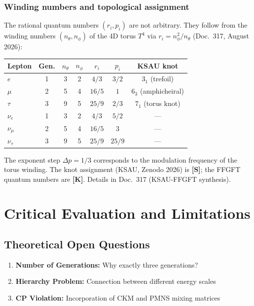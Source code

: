 	
\subsubsection{Winding numbers and topological assignment}

The rational quantum numbers $(r_i, p_i)$ are not arbitrary.
They follow from the winding numbers $(n_\theta, n_\phi)$ of
the 4D torus $T^4$ via $r_i = n_\phi^2 / n_\theta$ (Doc.~317,
August 2026):

\begin{center}
\begin{tabular}{lcccccc}
\toprule
Lepton & Gen. & $n_\theta$ & $n_\phi$ & $r_i$ & $p_i$ &
  KSAU knot \\
\midrule
$e$       & 1 & 3 & 2 & $4/3$  & $3/2$ & $3_1$ (trefoil) \\
$\mu$     & 2 & 5 & 4 & $16/5$ & $1$   & $6_3$ (amphicheiral) \\
$\tau$    & 3 & 9 & 5 & $25/9$ & $2/3$ & $7_1$ (torus knot) \\
$\nu_e$   & 1 & 3 & 2 & $4/3$  & $5/2$ & --- \\
$\nu_\mu$ & 2 & 5 & 4 & $16/5$ & $3$   & --- \\
$\nu_\tau$& 3 & 9 & 5 & $25/9$ & $25/9$& --- \\
\bottomrule
\end{tabular}
\end{center}

The exponent step $\Delta p = 1/3$ corresponds to the modulation
frequency of the torus winding. The knot assignment (KSAU,
Zenodo 2026) is \textbf{[S]}; the FFGFT quantum numbers are
\textbf{[K]}. Details in Doc.~317 (KSAU-FFGFT synthesis).

\section{Critical Evaluation and Limitations}
	\label{sec:critical_evaluation}
	
	\subsection{Theoretical Open Questions}
	\label{subsec:open_questions}
	
	\begin{enumerate}
		\item \textbf{Number of Generations:} Why exactly three generations?
		\item \textbf{Hierarchy Problem:} Connection between different energy scales
		\item \textbf{CP Violation:} Incorporation of CKM and PMNS mixing matrices
	\end{enumerate}
	
